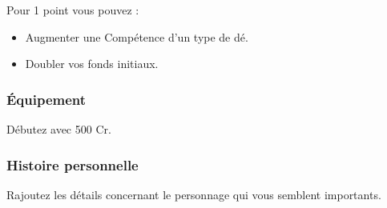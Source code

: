 Pour 1 point vous pouvez :
\begin{itemize}
	\item Augmenter une Compétence d’un type de dé.
	\item Doubler vos fonds initiaux.
\end{itemize}

\subsubsection{Équipement}
Débutez avec 500 Cr.

\subsubsection{Histoire personnelle}
Rajoutez les détails concernant le personnage qui vous semblent importants.
